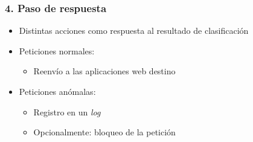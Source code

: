 \begin{frame}
    \frametitle{4. Paso de respuesta}

    \begin{itemize}[<2->]
        \item
        Distintas acciones como respuesta al resultado de clasificación

        \item
        Peticiones normales:

        \begin{itemize}
            \item
            Reenvío a las aplicaciones web destino
        \end{itemize}

        \item
        Peticiones anómalas:

        \begin{itemize}
            \item
            Registro en un \textit{log}

            \item
            Opcionalmente: bloqueo de la petición
        \end{itemize}
    \end{itemize}
\end{frame}
